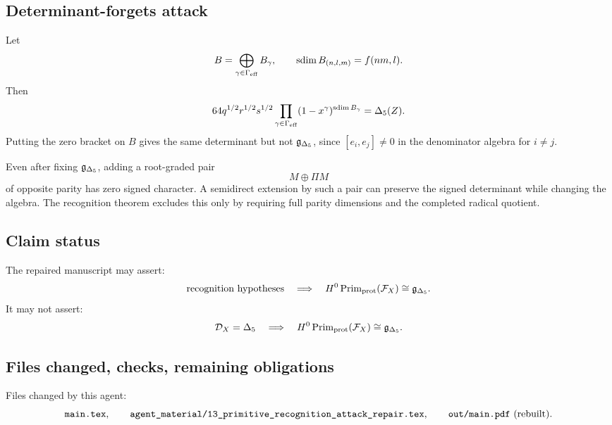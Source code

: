 \subsection{Determinant-forgets attack}

Let
\[
B=\bigoplus_{\gamma\in\Gamma_{\mathrm{eff}}}B_\gamma,\qquad
\operatorname{sdim} B_{(n,l,m)}=f(nm,l).
\]
Then
\[
64q^{1/2}r^{1/2}s^{1/2}
\prod_{\gamma\in\Gamma_{\mathrm{eff}}}(1-x^\gamma)^{\operatorname{sdim} B_\gamma}
=\Delta_5(Z).
\]
Putting the zero bracket on \(B\) gives the same determinant but not
\(\mathfrak g_{\Delta_5}\), since \([e_i,e_j]\ne0\) in the denominator algebra for
\(i\ne j\).

Even after fixing \(\mathfrak g_{\Delta_5}\), adding a root-graded pair
\[
M\oplus \Pi M
\]
of opposite parity has zero signed character.  A semidirect extension by
such a pair can preserve the signed determinant while changing the
algebra.  The recognition theorem excludes this only by requiring full
parity dimensions and the completed radical quotient.

\subsection{Claim status}

The repaired manuscript may assert:
\[
\hbox{recognition hypotheses}
\quad\Longrightarrow\quad
H^0\operatorname{Prim}_{\mathrm{prot}}(\mathcal F_X)\cong\mathfrak g_{\Delta_5} .
\]
It may not assert:
\[
\mathcal D_X=\Delta_5
\quad\Longrightarrow\quad
H^0\operatorname{Prim}_{\mathrm{prot}}(\mathcal F_X)\cong\mathfrak g_{\Delta_5} .
\]

\subsection{Files changed, checks, remaining obligations}

Files changed by this agent:
\[
\texttt{main.tex},\qquad
\texttt{agent\_material/13\_primitive\_recognition\_attack\_repair.tex},\qquad
\texttt{out/main.pdf}\ \hbox{(rebuilt)}.
\]

